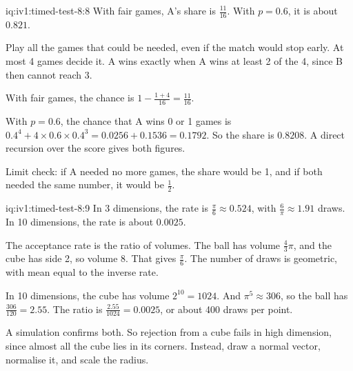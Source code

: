 \begin{solution}{iq:iv1:timed-test-8:8}
With fair games, A's share is $\frac{11}{16}$. With $p = 0.6$, it is about $0.821$.

Play all the games that could be needed, even if the match would stop early. At most 4 games decide it. A wins exactly when A wins at least 2 of the 4, since B then cannot reach 3.

With fair games, the chance is $1 - \frac{1 + 4}{16} = \frac{11}{16}$.

With $p = 0.6$, the chance that A wins 0 or 1 games is $0.4^4 + 4 \times 0.6 \times 0.4^3 = 0.0256 + 0.1536 = 0.1792$. So the share is $0.8208$. A direct recursion over the score gives both figures.

Limit check: if A needed no more games, the share would be 1, and if both needed the same number, it would be $\frac12$.


\end{solution}

\begin{solution}{iq:iv1:timed-test-8:9}
In 3 dimensions, the rate is $\frac{\pi}{6} \approx 0.524$, with $\frac{6}{\pi} \approx 1.91$ draws. In 10 dimensions, the rate is about $0.0025$.

The acceptance rate is the ratio of volumes. The ball has volume $\frac43\pi$, and the cube has side 2, so volume 8. That gives $\frac{\pi}{6}$. The number of draws is geometric, with mean equal to the inverse rate.

In 10 dimensions, the cube has volume $2^{10} = 1024$. And $\pi^5 \approx 306$, so the ball has $\frac{306}{120} = 2.55$. The ratio is $\frac{2.55}{1024} = 0.0025$, or about 400 draws per point.

A simulation confirms both. So rejection from a cube fails in high dimension, since almost all the cube lies in its corners. Instead, draw a normal vector, normalise it, and scale the radius.

\end{solution}

